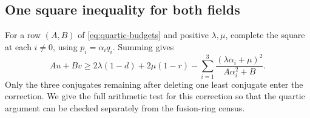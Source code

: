 \documentclass[11pt,a4paper]{article}
\theoremstyle{definition}\newtheorem{definition}[theorem]{Definition}
\theoremstyle{remark}\newtheorem{remark}[theorem]{Remark}
\numberwithin{equation}{section}
\begin{document}
\subsection{One square inequality for both fields}

For a row $(A,B)$ of \eqref{eq:quartic-budgets} and positive
$\lambda,\mu$, complete the square at each $i\ne0$, using
$p_i=\alpha_i q_i$. Summing gives
\begin{equation}\label{quart:weighted-square}
 Au+Bv\ge 2\lambda(1-d)+2\mu(1-r)
       -\sum_{i=1}^3\frac{(\lambda\alpha_i+\mu)^2}{A\alpha_i^2+B}.
\end{equation}
Only the three conjugates remaining after deleting one least conjugate
enter the correction. We give the full arithmetic test for this
correction so that the quartic argument can be checked separately from
the fusion-ring census.
\end{document}
